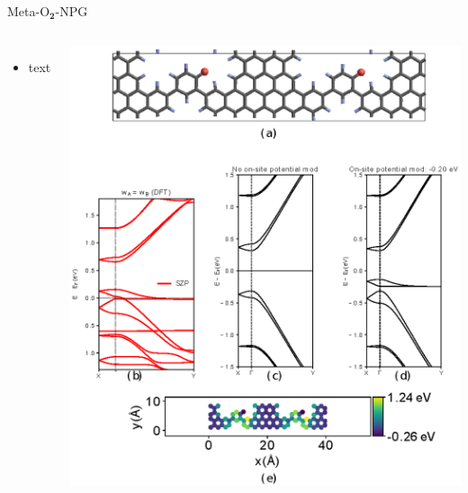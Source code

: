 \documentclass[hyperref={colorlinks=true,urlcolor=blue,linkcolor=.},aspectratio=1610,mathserif]{beamer}
\newcommand*\mathinhead[2]{\texorpdfstring{$\boldsymbol{#1}$}{#2}}
\begin{document}
\begin{frame}{Meta-O\mathinhead{_2}{_2}-NPG}
\centering
\begin{columns}[c]
    \begin{itemize}
        \item text
    \end{itemize}
    \includegraphics[width=\textwidth]{Figures/fig21.eps}
\end{columns}
\end{frame}
\end{document}
